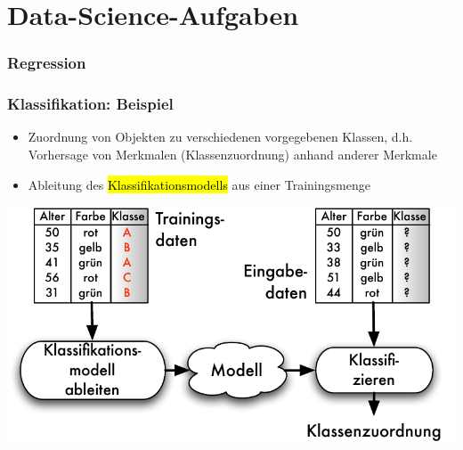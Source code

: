 
\section{Data-Science-Aufgaben}


\begin{frame}
  \frametitle{Regression}

\end{frame}


\begin{frame}
\frametitle{Klassifikation: Beispiel}


\begin{itemize}
\item  Zuordnung von Objekten zu verschiedenen vorgegebenen Klassen,
  d.h. Vorhersage von Merkmalen (Klassenzuordnung) anhand anderer
  Merkmale
    \item Ableitung des \hl{Klassifikationsmodells} aus einer Trainingsmenge
\end{itemize}

\begin{center}
\includegraphics[scale=.6]{fig1/klassifikation-prinzip.pdf}
\end{center}

\end{frame}


